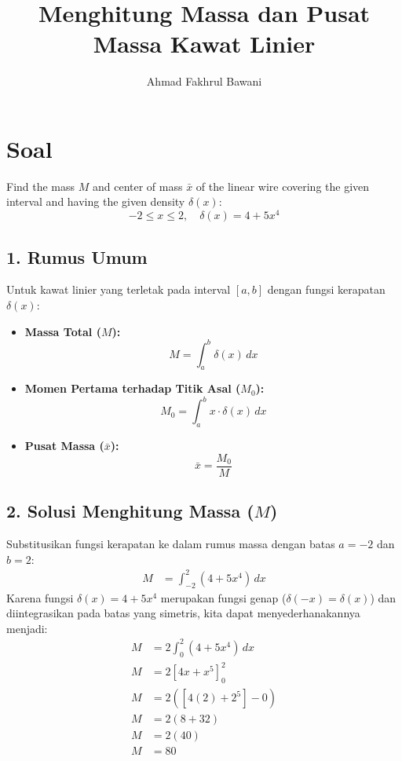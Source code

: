 \documentclass[12pt,a4paper]{article}
\title{Menghitung Massa dan Pusat Massa Kawat Linier}
\author{Ahmad Fakhrul Bawani}
\date{}
\begin{document}
\maketitle

\section*{Soal}

Find the mass $M$ and center of mass $\bar{x}$ of the linear wire covering the given interval and having the given density $\delta(x)$:
\begin{equation*}
  -2 \le x \le 2, \quad \delta(x) = 4 + 5x^4
\end{equation*}

\subsection*{1. Rumus Umum}
Untuk kawat linier yang terletak pada interval $[a, b]$ dengan fungsi kerapatan $\delta(x)$:
\begin{itemize}
  \item \textbf{Massa Total ($M$):}
    \begin{equation*}
      M = \int_{a}^{b} \delta(x) \, dx
    \end{equation*}
  \item \textbf{Momen Pertama terhadap Titik Asal ($M_0$):}
    \begin{equation*}
      M_0 = \int_{a}^{b} x \cdot \delta(x) \, dx
    \end{equation*}
  \item \textbf{Pusat Massa ($\bar{x}$):}
    \begin{equation*}
      \bar{x} = \frac{M_0}{M}
    \end{equation*}
\end{itemize}

\subsection*{2. Solusi Menghitung Massa ($M$)}
Substitusikan fungsi kerapatan ke dalam rumus massa dengan batas $a = -2$ dan $b = 2$:
\begin{align*}
  M &= \int_{-2}^{2} (4 + 5x^4) \, dx
\end{align*}
Karena fungsi $\delta(x) = 4 + 5x^4$ merupakan fungsi genap ($\delta(-x) = \delta(x)$) dan diintegrasikan pada batas yang simetris, kita dapat menyederhanakannya menjadi:
\begin{align*}
  M &= 2 \int_{0}^{2} (4 + 5x^4) \, dx \\
  M &= 2 \left[ 4x + x^5 \right]_{0}^{2} \\
  M &= 2 \left( \left[ 4(2) + 2^5 \right] - 0 \right) \\
  M &= 2 (8 + 32) \\
  M &= 2 (40) \\
  M &= 80
\end{align*}
\end{document}
